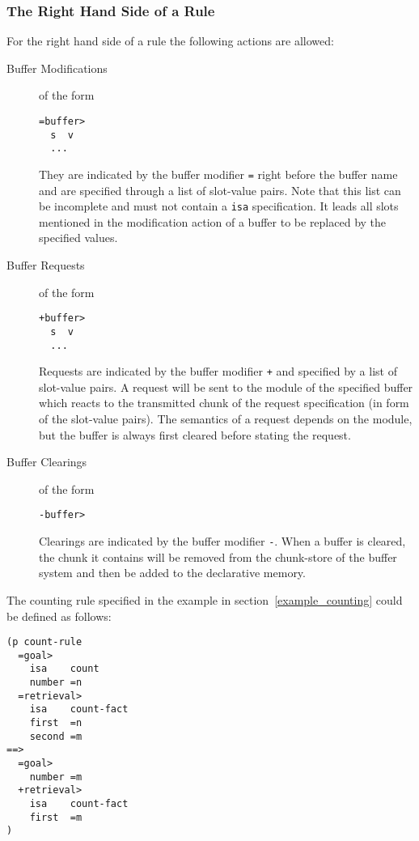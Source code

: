 \subsubsection{The Right Hand Side of a Rule}

For the right hand side of a rule the following actions are allowed:

\begin{description}
 \item[Buffer Modifications] of the form
\begin{lstlisting}
=buffer>
  s  v
  ...
\end{lstlisting}

They are indicated by the buffer modifier \lstinline|=| right before the buffer name and are specified through a list of slot-value pairs. Note that this list can be incomplete and must not contain a \lstinline|isa| specification. It leads all slots mentioned in the modification action of a buffer to be replaced by the specified values.

 \item[Buffer Requests] of the form
\begin{lstlisting}
+buffer>
  s  v
  ...
\end{lstlisting}

Requests are indicated by the buffer modifier \lstinline|+| and specified by a list of slot-value pairs. A request will be sent to the module of the specified buffer which reacts to the transmitted chunk of the request specification (in form of the slot-value pairs). The semantics of a request depends on the module, but the buffer is always first cleared before stating the request.
 \item[Buffer Clearings] of the form
 
\begin{lstlisting}
-buffer>
\end{lstlisting}

Clearings are indicated by the buffer modifier \lstinline|-|. When a buffer is cleared, the chunk it contains will be removed from the chunk-store of the buffer system and then be added to the declarative memory. 
\end{description}


\begin{example}
\label{ex:counting}
The counting rule specified in the example in section~\ref{example_counting} could be defined as follows:

\begin{lstlisting}
(p count-rule
  =goal> 
    isa    count
    number =n
  =retrieval>
    isa    count-fact
    first  =n
    second =m
==>
  =goal>
    number =m
  +retrieval>
    isa    count-fact
    first  =m
)
\end{lstlisting}
\end{example}

